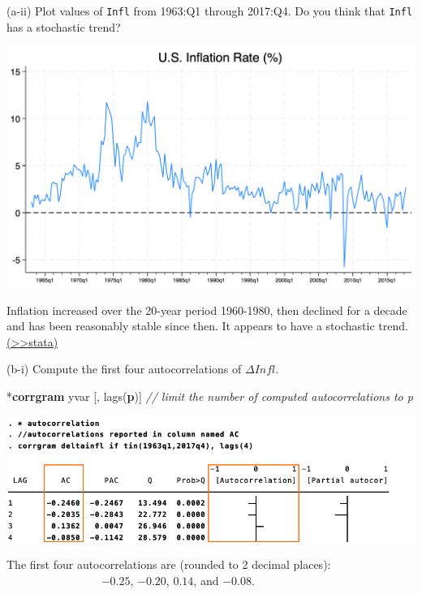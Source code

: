 \documentclass[
  10pt,
  ignorenonframetext,
]{beamer}
\newenvironment{Shaded}{\begin{snugshade}}{\end{snugshade}}
\newcommand{\CommentTok}[1]{\textcolor[rgb]{0.56,0.35,0.01}{\textit{#1}}}
\newcommand{\KeywordTok}[1]{\textcolor[rgb]{0.13,0.29,0.53}{\textbf{#1}}}
\newcommand{\NormalTok}[1]{#1}
\begin{document}
\begin{frame}{(a-ii) Plot values of \texttt{Infl} from 1963:Q1 through
2017:Q4. Do you think that \texttt{Infl} has a stochastic trend?}
\protect\hypertarget{Plot-infl-A2}{}
\begin{center}\includegraphics[width=0.85\linewidth]{pictures/Fig1-InflationRate} \end{center}

\footnotesize Inflation increased over the 20-year period 1960-1980,
then declined for a decade and has been reasonably stable since then. It
appears to have a stochastic trend.
\footnotesize \protect\hyperlink{Plot-infl}{(\textgreater\textgreater stata)}
\end{frame}

\begin{frame}[fragile]{(b-i) Compute the first four autocorrelations of
\(\Delta Infl\).}
\protect\hypertarget{b-i-compute-the-first-four-autocorrelations-of-delta-infl.}{}
\small

\begin{Shaded}
\begin{Highlighting}[]
\NormalTok{*}\KeywordTok{corrgram}\NormalTok{ yvar [, lags(}\KeywordTok{p}\NormalTok{)]}
\CommentTok{// limit the number of computed autocorrelations to p}
\end{Highlighting}
\end{Shaded}

\begin{flushleft}\includegraphics[width=1\linewidth]{pictures/(b-i)corrgram} \end{flushleft}

The first four autocorrelations are (rounded to 2 decimal places):
\(\qquad \qquad \qquad \qquad\) \(-0.25\), \(-0.20\), \(0.14\), and
\(-0.08\).
\end{frame}
\end{document}

